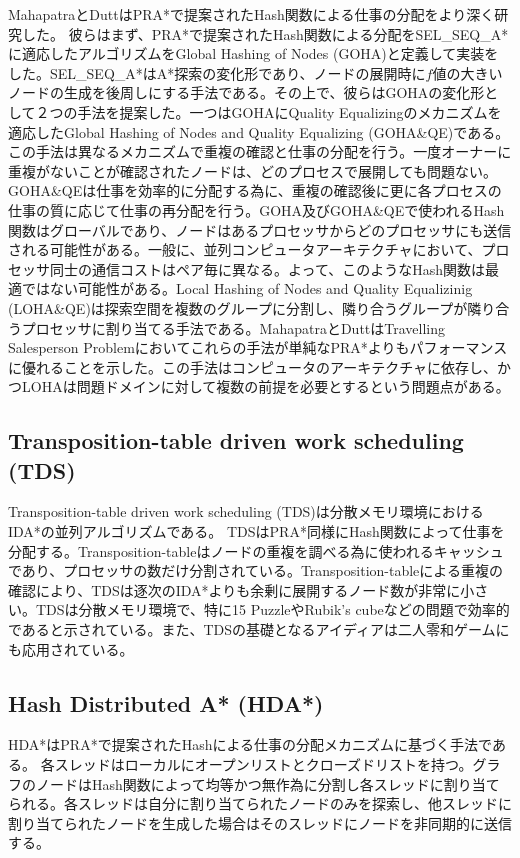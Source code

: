 \documentclass[uplatex]{jsarticle}
\begin{document}
MahapatraとDuttはPRA*で提案されたHash関数による仕事の分配をより深く研究した\cite{mahapatra1997scalable}。
彼らはまず、PRA*で提案されたHash関数による分配をSEL\_SEQ\_A*に適応したアルゴリズムをGlobal Hashing of Nodes (GOHA)と定義して実装をした。SEL\_SEQ\_A*はA*探索の変化形であり、ノードの展開時に$f$値の大きいノードの生成を後周しにする手法である。その上で、彼らはGOHAの変化形として２つの手法を提案した。一つはGOHAにQuality Equalizingのメカニズムを適応したGlobal Hashing of Nodes and Quality Equalizing (GOHA\&QE)である。この手法は異なるメカニズムで重複の確認と仕事の分配を行う。一度オーナーに重複がないことが確認されたノードは、どのプロセスで展開しても問題ない。GOHA\&QEは仕事を効率的に分配する為に、重複の確認後に更に各プロセスの仕事の質に応じて仕事の再分配を行う。GOHA及びGOHA\&QEで使われるHash関数はグローバルであり、ノードはあるプロセッサからどのプロセッサにも送信される可能性がある。一般に、並列コンピュータアーキテクチャにおいて、プロセッサ同士の通信コストはペア毎に異なる。よって、このようなHash関数は最適ではない可能性がある。Local Hashing of Nodes and Quality Equalizinig (LOHA\&QE)は探索空間を複数のグループに分割し、隣り合うグループが隣り合うプロセッサに割り当てる手法である。MahapatraとDuttはTravelling Salesperson Problemにおいてこれらの手法が単純なPRA*よりもパフォーマンスに優れることを示した。この手法はコンピュータのアーキテクチャに依存し、かつLOHAは問題ドメインに対して複数の前提を必要とするという問題点がある。

\subsection{Transposition-table driven work scheduling (TDS)}
Transposition-table driven work scheduling (TDS)は分散メモリ環境におけるIDA*の並列アルゴリズムである\cite{romein1999transposition}。
TDSはPRA*同様にHash関数によって仕事を分配する。Transposition-tableはノードの重複を調べる為に使われるキャッシュであり、プロセッサの数だけ分割されている。Transposition-tableによる重複の確認により、TDSは逐次のIDA*よりも余剰に展開するノード数が非常に小さい。TDSは分散メモリ環境で、特に15 PuzzleやRubik's cubeなどの問題で効率的であると示されている。また、TDSの基礎となるアイディアは二人零和ゲームにも応用されている。


\subsection{Hash Distributed A* (HDA*)}
HDA*はPRA*で提案されたHashによる仕事の分配メカニズムに基づく手法である。
各スレッドはローカルにオープンリストとクローズドリストを持つ。グラフのノードはHash関数によって均等かつ無作為に分割し各スレッドに割り当てられる。各スレッドは自分に割り当てられたノードのみを探索し、他スレッドに割り当てられたノードを生成した場合はそのスレッドにノードを非同期的に送信する。
\end{document}
